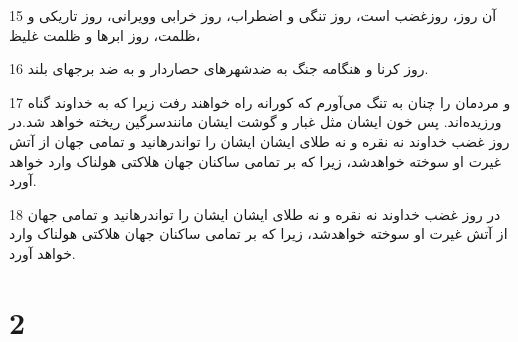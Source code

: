 \par 15 آن روز، روزغضب است، روز تنگی و اضطراب، روز خرابی وویرانی، روز تاریکی و ظلمت، روز ابرها و ظلمت غلیظ،
\par 16 روز کرنا و هنگامه جنگ به ضدشهرهای حصاردار و به ضد برجهای بلند.
\par 17 و مردمان را چنان به تنگ می‌آورم که کورانه راه خواهند رفت زیرا که به خداوند گناه ورزیده‌اند. پس خون ایشان مثل غبار و گوشت ایشان مانندسرگین ریخته خواهد شد.در روز غضب خداوند نه نقره و نه طلای ایشان ایشان را تواندرهانید و تمامی جهان از آتش غیرت او سوخته خواهدشد، زیرا که بر تمامی ساکنان جهان هلاکتی هولناک وارد خواهد آورد.
\par 18 در روز غضب خداوند نه نقره و نه طلای ایشان ایشان را تواندرهانید و تمامی جهان از آتش غیرت او سوخته خواهدشد، زیرا که بر تمامی ساکنان جهان هلاکتی هولناک وارد خواهد آورد.

\chapter{2}

